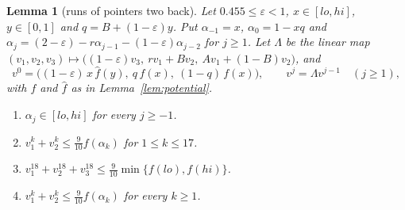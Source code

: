 \documentclass[11pt]{amsart}
\newtheorem{lemma}[theorem]{Lemma}
\theoremstyle{definition}
\theoremstyle{remark}
\newcommand{\eps}{\varepsilon}
\begin{document}
\begin{lemma}[runs of pointers two back]\label{lem:runs}
Let $0.455\le\eps<1$, $x\in[lo,hi]$, $y\in[0,1]$ and $q=B+(1-\eps)y$. Put $\alpha_{-1}=x$,
$\alpha_0=1-xq$ and $\alpha_j=(2-\eps)-r\alpha_{j-1}-(1-\eps)\alpha_{j-2}$ for $j\ge1$. Let
$\Lambda$ be the linear map
$(v_1,v_2,v_3)\mapsto\bigl((1-\eps)v_3,\ rv_1+Bv_2,\ Av_1+(1-B)v_2\bigr)$, and
\[
v^0=\bigl((1-\eps)\,x\,\hat f(y),\ q\,f(x),\ (1-q)\,f(x)\bigr),\qquad v^j=\Lambda v^{j-1}\quad(j\ge1),
\]
with $f$ and $\hat f$ as in Lemma~\ref{lem:potential}.
\begin{enumerate}[label=(\alph*),leftmargin=2.4em]
\item $\alpha_j\in[lo,hi]$ for every $j\ge-1$.
\item $v^k_1+v^k_2\le\frac9{10}f(\alpha_k)$ for $1\le k\le17$.
\item $v^{18}_1+v^{18}_2+v^{18}_3\le\frac9{10}\min\{f(lo),f(hi)\}$.
\item $v^k_1+v^k_2\le\frac9{10}f(\alpha_k)$ for every $k\ge1$.
\end{enumerate}
\end{lemma}
\end{document}
